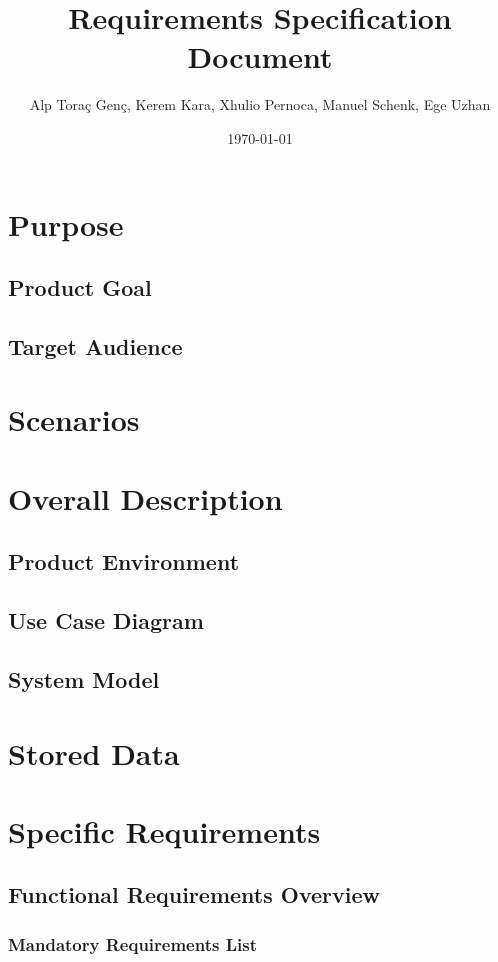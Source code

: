 \documentclass[10pt,a4paper]{report}
\title{Requirements Specification Document}
\author{Alp Toraç Genç, Kerem Kara, Xhulio Pernoca, Manuel Schenk, Ege Uzhan}
\date{\today}
\begin{document}
\maketitle
\label{sec:title}
\tableofcontents

\chapter{Purpose}
\section{Product Goal}
\section{Target Audience}
\chapter{Scenarios}

\chapter{Overall Description}
\section{Product Environment}
\section{Use Case Diagram}
\section{System Model}

\chapter{Stored Data}

\chapter{Specific Requirements}
\section{Functional Requirements Overview}
\subsection{Mandatory Requirements List}
\end{document}

